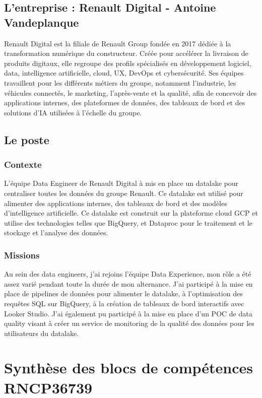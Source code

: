 \documentclass{article}
\begin{document}
\subsection{L'entreprise : Renault Digital - Antoine Vandeplanque}
Renault Digital est la filiale de Renault Group fondée en 2017 dédiée à la transformation
numérique du constructeur. Créée pour accélérer la livraison de produits digitaux,
elle regroupe des profils spécialisés en développement logiciel, data,
intelligence artificielle, cloud, UX, DevOps et cybersécurité. Ses équipes
travaillent pour les différents métiers du groupe, notamment l'industrie, les
véhicules connectés, le marketing, l'après-vente et la qualité, afin de concevoir
des applications internes, des plateformes de données, des tableaux de bord et des
solutions d'IA utilisées à l'échelle du groupe.
\subsection{Le poste}
\subsubsection{Contexte}
L'équipe Data Engineer de Renault Digital à mis en place un datalake pour centraliser toutes les données du groupe Renault. Ce datalake est utilisé pour alimenter des applications internes, des tableaux de bord et des modèles d'intelligence artificielle. Ce datalake est construit sur la plateforme cloud GCP et utilise des technologies telles que BigQuery, et Dataproc pour le traitement et le stockage et l'analyse des données.
\subsubsection{Missions}
Au sein des data engineers, j'ai rejoins l'équipe Data Experience, mon rôle a été assez varié pendant toute la durée de mon alternance. J'ai participé à la mise en place de pipelines de données pour alimenter le datalake, à l'optimisation des requêtes SQL sur BigQuery, à la création de tableaux de bord interactifs avec Looker Studio. J'ai également pu participé à la mise en place d'un POC de data quality visant à créer un service de monitoring de la qualité des données pour les utilisateurs du datalake.


\newpage
\section{Synthèse des blocs de compétences RNCP36739}
\end{document}
